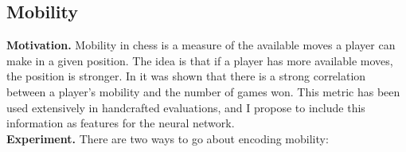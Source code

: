 
\subsection{Mobility}

\textbf{Motivation.} Mobility in chess is a measure of the available moves a player can make in a given position. The idea is that if a player has more available moves, the position is stronger. In \cite{slater:1950} it was shown that there is a strong correlation between a player's mobility and the number of games won. This metric has been used extensively in handcrafted evaluations, and I propose to include this information as features for the neural network. \\

\textbf{Experiment.} There are two ways to go about encoding mobility:


